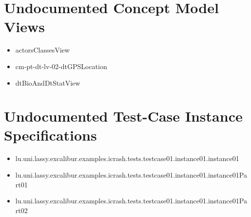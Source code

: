 \section[Undocumented Concept Model Views]{Undocumented Concept Model Views}
\begin{itemize}
\item actorsClassesView 
\item cm-pt-dt-lv-02-dtGPSLocation 
\item dtBioAndDtStatView 
\end{itemize}







\section[Undocumented Test-Case Instance Specifications]{Undocumented Test-Case Instance Specifications}
\begin{itemize}
\item lu.uni.lassy.excalibur.examples.icrash.tests.testcase01.instance01.instance01 
\item lu.uni.lassy.excalibur.examples.icrash.tests.testcase01.instance01.instance01Part01 
\item lu.uni.lassy.excalibur.examples.icrash.tests.testcase01.instance01.instance01Part02 
\end{itemize}



